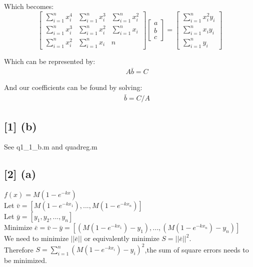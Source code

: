 \documentclass[paper=a4, fontsize=12pt]{article}%
\begin{document}
Which becomes: \\

\begin{equation}
	\begin{bmatrix}
	    \sum_{i=1}^{n}x_i^4       & \sum_{i=1}^{n}x_i^3 	& \sum_{i=1}^{n}x_i^2 \\
	    \sum_{i=1}^{n}x_i^3       & \sum_{i=1}^{n}x_i^2 	& \sum_{i=1}^{n}x_i \\
	    \sum_{i=1}^{n}x_i^2       & \sum_{i=1}^{n}x_i 		& n
	\end{bmatrix}
	\begin{bmatrix}
	   a \\
	   b \\
	   c
	\end{bmatrix}
	=
	\begin{bmatrix}
	    \sum_{i=1}^{n}x_i^2y_i \\
	    \sum_{i=1}^{n}x_iy_i \\
	    \sum_{i=1}^{n}y_i
	\end{bmatrix}
\end{equation}

Which can be represented by: \\
\begin{equation}
	\begin{aligned}
		\qquad A\bar{b} = C
	\end{aligned}
\end{equation}

And our coefficients can be found by solving: \\
\begin{equation}
	\begin{aligned}
		\qquad \bar{b} = C/A
	\end{aligned}
\end{equation}
\subsection{[1] (b)}
See q1\_1\_b.m and quadreg.m
\subsection{[2] (a)}
$f(x) = M(1-e^{-kx})$ \\
Let $\bar{v} = [M(1-e^{-kx_1}),...,M(1-e^{-kx_n})]$ \\
Let $\bar{y} = [y_1,y_2,...,y_n]$ \\
Minimize $\bar{e} = \bar{v} - \bar{y} = [(M(1-e^{-kx_1})-y_1),...,(M(1-e^{-kx_n})-y_n)]$ \\
We need to minimize $||\bar{e}||$ or equivalently minimize $S = ||\bar{e}||^2$. \\
Therefore $S = \sum_{i=1}^{n}(M(1-e^{-kx_i})-y_i)^2$,the sum of square errors needs to be minimized.\\
\end{document}
